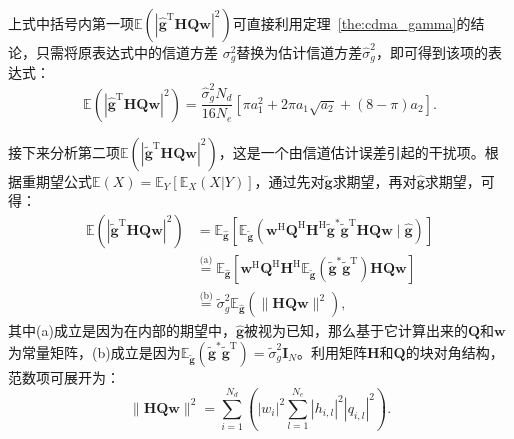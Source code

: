 上式中括号内第一项$\mathbb{E}( \left| \bm{\hat{g}}^\mathrm{T} \bm H \bm Q \bm w \right|^2 )$可直接利用定理~\ref{the:cdma_gamma}的结论，只需将原表达式中的信道方差 $\sigma_g^2$替换为估计信道方差$\hat{\sigma}_g^2$，即可得到该项的表达式：
\begin{equation}\label{eq:cdma_term1_imp}
	\mathbb{E}( \left| \bm{\hat{g}}^\mathrm{T} \bm H \bm Q \bm w \right|^2 ) = \frac{\hat{\sigma}_g^2 N_d}{16 N_e}\left[\pi a_1^2 + 2\pi a_1\sqrt{a_2} + (8-\pi) a_2\right].
\end{equation}

接下来分析第二项$\mathbb{E}( \left| \bm{\tilde{g}}^\mathrm{T} \bm H \bm Q \bm w \right|^2 )$，这是一个由信道估计误差引起的干扰项。根据重期望公式$\mathbb{E}(X) = \mathbb{E}_Y[\mathbb{E}_X(X|Y)]$，通过先对$\tilde{\bm g}$求期望，再对$\hat{\bm g}$求期望，可得：
\begin{align}\label{eq:cdma_term2_expand}
	\mathbb{E}( \left| \bm{\tilde{g}}^\mathrm{T} \bm H \bm Q \bm w \right|^2 ) &= \mathbb{E}_{\hat{\bm g}}\left[ \mathbb{E}_{\tilde{\bm g}}\left( \bm w^\mathrm{H} \bm Q^\mathrm{H} \bm H^\mathrm{H} \tilde{\bm g}^* \tilde{\bm g}^\mathrm{T} \bm H \bm Q \bm w \mid \hat{\bm g} \right) \right] \\
	&\overset{\text{(a)}}{=} \mathbb{E}_{\hat{\bm g}}\left[ \bm w^\mathrm{H} \bm Q^\mathrm{H} \bm H^\mathrm{H} \mathbb{E}_{\tilde{\bm g}}(\tilde{\bm g}^* \tilde{\bm g}^\mathrm{T}) \bm H \bm Q \bm w \right] \\
	&\overset{\text{(b)}}{=} \tilde{\sigma}_g^2 \mathbb{E}_{\hat{\bm g}}\left( \|\bm H \bm Q \bm w\|^2 \right),
\end{align}
其中(a)成立是因为在内部的期望中，$\hat{\bm g}$被视为已知，那么基于它计算出来的$\bm Q$和$\bm w$为常量矩阵，(b)成立是因为$\mathbb{E}_{\tilde{\bm g}} \left( \bm{\tilde{g}}^* \bm{\tilde{g}}^\mathrm{T} \right) = \tilde{\sigma}_g^2 \bm{I}_N$。利用矩阵$\bm H$和$\bm Q$的块对角结构，范数项可展开为：
\begin{equation}
	\|\bm H \bm Q \bm w\|^2 = \sum_{i=1}^{N_d} \left( |w_i|^2 \sum_{l=1}^{N_e} |h_{i,l}|^2 |q_{i,l}|^2\right).
\end{equation}

